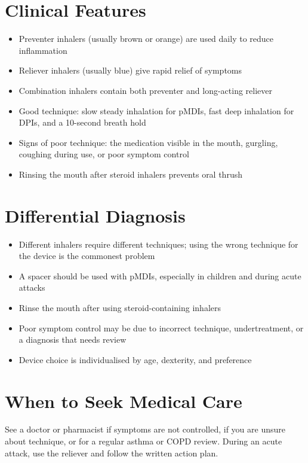 \section*{Clinical Features}
\begin{itemize}
    \item Preventer inhalers (usually brown or orange) are used daily to reduce inflammation
    \item Reliever inhalers (usually blue) give rapid relief of symptoms
    \item Combination inhalers contain both preventer and long-acting reliever
    \item Good technique: slow steady inhalation for pMDIs, fast deep inhalation for DPIs, and a 10-second breath hold
    \item Signs of poor technique: the medication visible in the mouth, gurgling, coughing during use, or poor symptom control
    \item Rinsing the mouth after steroid inhalers prevents oral thrush
\end{itemize}

\section*{Differential Diagnosis}
\begin{itemize}
    \item Different inhalers require different techniques; using the wrong technique for the device is the commonest problem
    \item A spacer should be used with pMDIs, especially in children and during acute attacks
    \item Rinse the mouth after using steroid-containing inhalers
    \item Poor symptom control may be due to incorrect technique, undertreatment, or a diagnosis that needs review
    \item Device choice is individualised by age, dexterity, and preference
\end{itemize}

\section*{When to Seek Medical Care}
See a doctor or pharmacist if symptoms are not controlled, if you are unsure about technique, or for a regular asthma or COPD review. During an acute attack, use the reliever and follow the written action plan.

